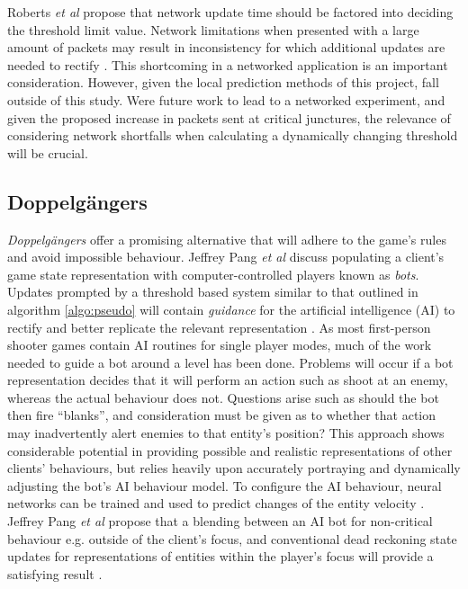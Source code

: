 \documentclass[journal]{IEEEtran}
\begin{document}
Roberts \textit{et al} propose that network update time should be factored into deciding the threshold limit value. Network limitations when presented with a large amount of packets may result in inconsistency for which additional updates are needed to rectify \cite{roberts2008bounding}. This shortcoming in a networked application is an important consideration. However, given the local prediction methods of this project, fall outside of this study. Were future work to lead to a networked experiment, and given the proposed increase in packets sent at critical junctures, the relevance of considering network shortfalls when calculating a dynamically changing threshold will be crucial.

\subsection{Doppelg\"{a}ngers} \label{doppelgangers}

\textit{Doppelg\"{a}ngers} offer a promising alternative that will adhere to the game's rules and avoid impossible behaviour. Jeffrey Pang \textit{et al} discuss populating a client's game state representation with computer-controlled players known as \textit{bots}. Updates prompted by a threshold based system similar to that outlined in algorithm \ref{algo:pseudo} will contain \textit{guidance} for the artificial intelligence (AI) to rectify and better replicate the relevant representation \cite{pang2007scaling} \cite{bharambe2008donnybrook}. As most first-person shooter games contain AI routines for single player modes, much of the work needed to guide a bot around a level has been done. Problems will occur if a bot representation decides that it will perform an action such as shoot at an enemy, whereas the actual behaviour does not. Questions arise such as should the bot then fire ``blanks'', and consideration must be given as to whether that action may inadvertently alert enemies to that entity's position? This approach shows considerable potential in providing possible and realistic representations of other clients' behaviours, but relies heavily upon accurately portraying and dynamically adjusting the bot's AI behaviour model. To configure the AI behaviour, neural networks can be trained and used to predict changes of the entity velocity \cite{mccoy2007multistep}. Jeffrey Pang \textit{et al} propose that a blending between an AI bot for non-critical behaviour e.g. outside of the client's focus, and conventional dead reckoning state updates for representations of entities within the player's focus will provide a satisfying result \cite{pang2007scaling}.
\end{document}
